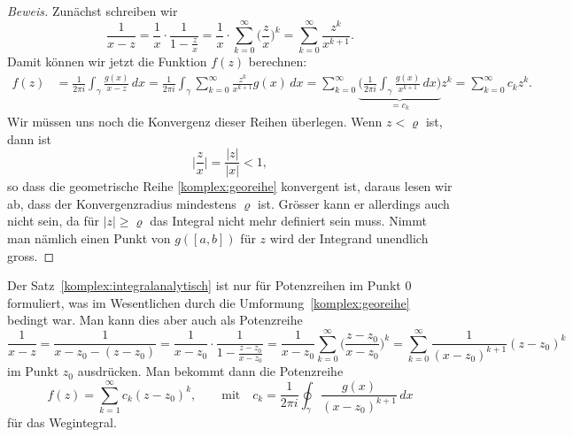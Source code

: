\begin{proof}[Beweis]
Zunächst schreiben wir
\begin{equation}
\frac{1}{x-z}
=
\frac1x\cdot \frac{1}{1-\displaystyle\frac{z}{x}}
=
\frac1x\cdot \sum_{k=0}^\infty \biggl(\frac{z}{x}\biggr)^k
=
\sum_{k=0}^\infty \frac{z^k}{x^{k+1}}.
\label{komplex:georeihe}
\end{equation}
Damit können wir jetzt die Funktion $f(z)$ berechnen:
\begin{align*}
f(z)
&=
\frac1{2\pi i} \int_{\gamma} \frac{g(x)}{x-z}\,dx
=
\frac1{2\pi i} \int_{\gamma} \sum_{k=0}^\infty \frac{z^k}{x^{k+1}}g(x)\,dx
=
\sum_{k=0}^\infty
\underbrace{\biggl(\frac1{2\pi i} \int_{\gamma} \frac{g(x)}{x^{k+1}}\,dx\biggr)}_{\displaystyle =c_k}
z^k
=
\sum_{k=0}^\infty c_kz^k.
\end{align*}
Wir müssen uns noch die Konvergenz dieser Reihen überlegen.
Wenn $z<\varrho$ ist, dann ist
\[
\biggl|\frac{z}{x}\biggr| 
=
\frac{|z|}{|x|}
<1,
\]
so dass die geometrische Reihe \eqref{komplex:georeihe} konvergent ist,
daraus lesen wir ab, dass der Konvergenzradius mindestens $\varrho$
ist.
Grösser kann er allerdings auch nicht sein, da für $|z|\ge \varrho$
das Integral nicht mehr definiert sein muss.
Nimmt man nämlich einen Punkt von $g([a,b])$ für $z$ wird der Integrand
unendlich gross.
\end{proof}

Der Satz~\ref{komplex:integralanalytisch} ist nur für Potenzreihen
im Punkt $0$ formuliert, was im Wesentlichen durch die
Umformung~\eqref{komplex:georeihe} bedingt war.
Man kann dies aber auch als Potenzreihe
\[
\frac1{x-z}
=
\frac1{x-z_0-(z-z_0)}
=
\frac1{x-z_0}\cdot\frac1{1-\displaystyle\frac{z-z_0}{x-z_0}}
=
\frac1{x-z_0}\sum_{k=0}^\infty\biggl(\frac{z-z_0}{x-z_0}\biggr)^k
=
\sum_{k=0}^\infty\frac1{(x-z_0)^{k+1}}(z-z_0)^k
\]
im Punkt $z_0$ ausdrücken.
Man bekommt dann die Potenzreihe
\[
f(z) = \sum_{k=1}^\infty c_k(z-z_0)^k,\qquad
\text{mit}\quad
c_k=\frac1{2\pi i}\oint_\gamma\frac{g(x)}{(x-z_0)^{k+1}}\,dx
\]
für das Wegintegral.

